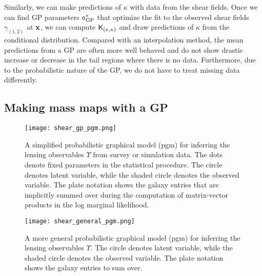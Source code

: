 Similarly, we can make predictions of $\kappa$ with data from the shear fields. 
Once we can find GP parameters $a_{\rm GP}^*$ that optimize the fit to
the observed shear fields $\gamma_{(1, 2)}$ at $\mathbf{x}$, we can compute $\mathsf{K}_{(\kappa,
\kappa)}$ and draw predictions of $\kappa$ from the conditional distribution. 
Compared with an interpolation method, the mean predictions from a GP are
often more well behaved and do not show drastic increase or decrease 
in the tail regions where there is no data. Furthermore, due to the
probabilistic nature of the GP, we do not have to treat missing 
data differently. 

\subsection{Making mass maps with a GP}
\begin{figure}
	\centering
	\texttt{[image: shear\_gp\_pgm.png]}
	\caption{A simplified probabilistic graphical model (pgm) for inferring
		the lensing observables $\Upsilon$ from survey or simulation data. The dots
		denote fixed parameters in the statistical procedure. The circle denotes
		latent variable, while the shaded circle denotes 
		the observed variable. The plate notation shows the galaxy entries that are
		implicitly summed over during the computation of matrix-vector
		products in the log marginal likelihood.
		\label{fig:simplified_pgm}}
\end{figure}

\begin{figure}
	\centering
	\texttt{[image: shear\_general\_pgm.png]}
	\caption{A more general probabilistic graphical model (pgm) for inferring
		the lensing observables $\Upsilon$. The circle denotes
		latent variable, while the shaded circle denotes 
		the observed variable. The plate notation shows the galaxy entries to sum
		over.
		\label{fig:general_pgm}}
\end{figure}


